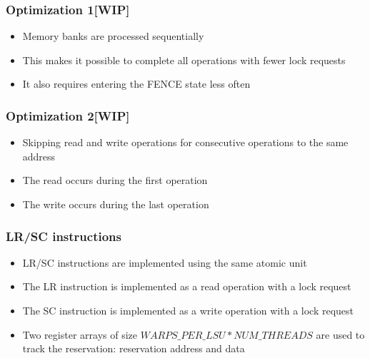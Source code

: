 \documentclass[aspectratio=169]{beamer}
\begin{document}
\begin{frame}
  \frametitle{Optimization 1[WIP]}
  \begin{itemize}
    \item Memory banks are processed sequentially
    \item This makes it possible to complete all operations with fewer lock requests
    \item It also requires entering the FENCE state less often
  \end{itemize}
\end{frame}

\begin{frame}
  \frametitle{Optimization 2[WIP]}
  \begin{itemize}
    \item Skipping read and write operations for consecutive operations to the same address
    \item The read occurs during the first operation
    \item The write occurs during the last operation
  \end{itemize}
\end{frame}

\begin{frame}
  \frametitle{LR/SC instructions}
  \begin{itemize}
    \item LR/SC instructions are implemented using the same atomic unit
    \item The LR instruction is implemented as a read operation with a lock request
    \item The SC instruction is implemented as a write operation with a lock request
    \item Two register arrays of size $WARPS\_PER\_LSU \ast NUM\_THREADS$ are used to track the reservation: reservation address and data
  \end{itemize}
\end{frame}
\end{document}
